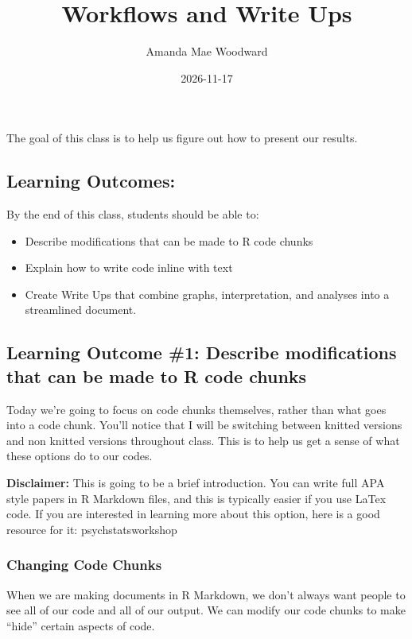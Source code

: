\documentclass[
]{article}
\title{Workflows and Write Ups}
\author{Amanda Mae Woodward}
\date{2026-11-17}
\begin{document}
\maketitle

The goal of this class is to help us figure out how to present our
results.

\subsection{Learning Outcomes:}\label{learning-outcomes}

By the end of this class, students should be able to:

\begin{itemize}
\item
  Describe modifications that can be made to R code chunks
\item
  Explain how to write code inline with text
\item
  Create Write Ups that combine graphs, interpretation, and analyses
  into a streamlined document.
\end{itemize}

\subsection{Learning Outcome \#1: Describe modifications that can be
made to R code
chunks}\label{learning-outcome-1-describe-modifications-that-can-be-made-to-r-code-chunks}

Today we're going to focus on code chunks themselves, rather than what
goes into a code chunk. You'll notice that I will be switching between
knitted versions and non knitted versions throughout class. This is to
help us get a sense of what these options do to our codes.

\textbf{Disclaimer:} This is going to be a brief introduction. You can
write full APA style papers in R Markdown files, and this is typically
easier if you use LaTex code. If you are interested in learning more
about this option, here is a good resource for it: psychstatsworkshop

\subsubsection{Changing Code Chunks}\label{changing-code-chunks}

When we are making documents in R Markdown, we don't always want people
to see all of our code and all of our output. We can modify our code
chunks to make ``hide'' certain aspects of code.
\end{document}

